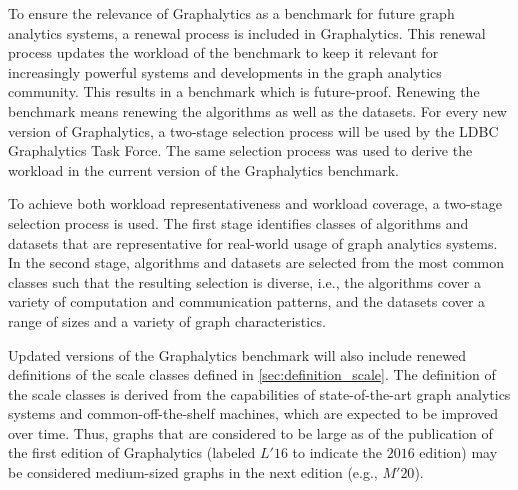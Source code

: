 To ensure the relevance of Graphalytics as a benchmark for future graph analytics systems, a renewal process is included in Graphalytics. This renewal process updates the workload of the benchmark to keep it relevant for increasingly powerful systems and developments in the graph analytics community. This results in a benchmark which is future-proof. Renewing the benchmark means renewing the algorithms as well as the datasets. For every new version of Graphalytics, a two-stage selection process will be used by the LDBC Graphalytics Task Force. The same selection process was used to derive the workload in the current version of the Graphalytics benchmark.

To achieve both workload representativeness and workload coverage, a two-stage selection process is used.  The first stage identifies classes of algorithms and datasets that are representative for real-world usage of graph analytics systems. In the second stage, algorithms and datasets are selected from the most common classes such that the resulting selection is diverse, i.e., the algorithms cover a variety of computation and communication patterns, and the datasets cover a range of sizes and a variety of graph characteristics.

Updated versions of the Graphalytics benchmark will also include renewed definitions of the scale classes defined in \autoref{sec:definition_scale}. The definition of the scale classes is derived from the capabilities of state-of-the-art graph analytics systems and common-off-the-shelf machines, which are expected to be improved over time. Thus, graphs that are considered to be large as of the publication of the first edition of Graphalytics (labeled $L'16$ to indicate the $2016$ edition) may be considered medium-sized graphs in the next edition (e.g., $M'20$).

